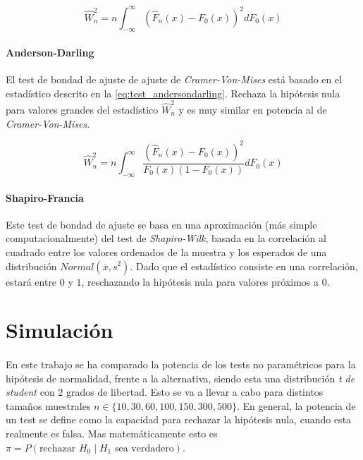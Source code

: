 \documentclass[a4paper, spanish]{article}
\begin{document}
    \begin{equation}
    \label{eq:test_cramervonmises}
      \widehat{W}^2_n = n \int_{-\infty}^{\infty} \left(\widehat{F}_n(x) - F_0(x) \right)^2 d F_0(x)
    \end{equation}

    \paragraph{Anderson-Darling}
    El test de bondad de ajuste de ajuste de \emph{Cramer-Von-Mises} está basado en el estadístico descrito en la \autoref{eq:test_andersondarling}. Rechaza la hipótesis nula para valores grandes del estadístico $\widehat{W}^2_n$ y es muy similar en potencia al de \emph{Cramer-Von-Mises}.

    \begin{equation}
    \label{eq:test_andersondarling}
      \widehat{W}^2_n = n \int_{-\infty}^{\infty} \frac{\left(\widehat{F}_n(x) - F_0(x) \right)^2}{ F_0(x) (1 - F_0(x))} d F_0(x)
    \end{equation}

    \paragraph{Shapiro-Francia}
    Este test de bondad de ajuste se basa en una aproximación (más simple computacionalmente) del test de \emph{Shapiro-Wilk}, basada en la correlación al cuadrado entre los valores ordenados de la muestra y los esperados de una distribución $Normal(\overline{x}, s^2)$. Dado que el estadístico consiste en una correlación, estará entre $0$ y $1$, reschazando la hipótesis nula para valores próximos a $0$.

  \section{Simulación}
  \label{sec:simulation}

    \paragraph{}
    En este trabajo se ha comparado la potencia de los tests no paramétricos para la hipótesis de normalidad, frente a la alternativa, siendo esta una distribución \emph{t de student} con $2$ grados de libertad. Esto se va a llevar a cabo para distintos tamaños muestrales $n \in \{10, 30, 60, 100, 150, 300, 500\}$. En general, la potencia de un test se define como la capacidad para rechazar la hipótesis nula, cuando esta realmente es falsa. Mas matemáticamente esto es $\pi = P\left(\text{rechazar }H_{0} \mid H_{1} \text{ sea verdadero}\right)$.
\end{document}
